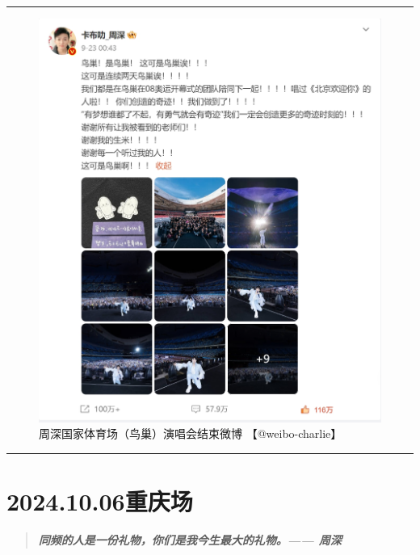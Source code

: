 \documentclass[]{ctexbook}
\begin{document}
\begin{center}\rule{0.5\linewidth}{0.5pt}\end{center}

\begin{figure}

{\centering \includegraphics{img/weibo/beijing-20240923} 

}

\caption{周深国家体育场（鸟巢）演唱会结束微博 【@weibo-charlie】}\label{fig:unnamed-chunk-92}
\end{figure}

\begin{center}\rule{0.5\linewidth}{0.5pt}\end{center}

\chapter{2024.10.06重庆场}\label{chongqing-20241006}

\begin{quote}
\textbf{\emph{同频的人是一份礼物，你们是我今生最大的礼物。------ 周深}}
\end{quote}
\end{document}
